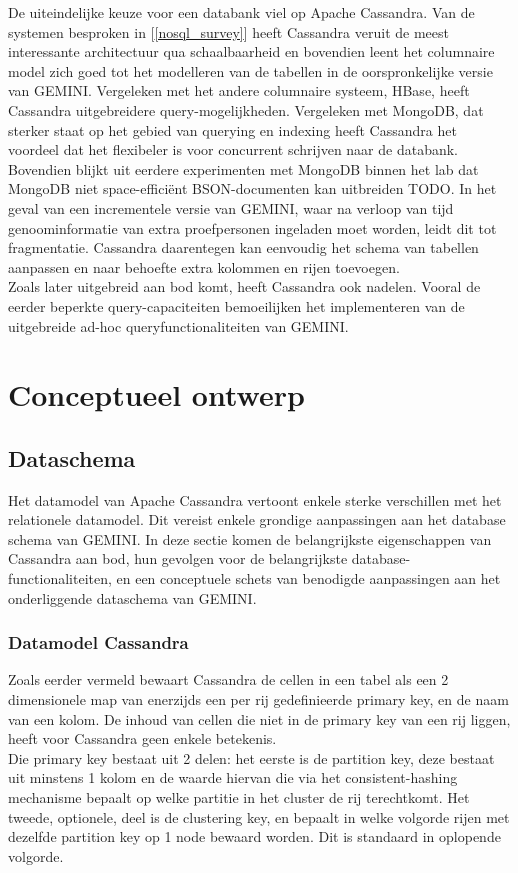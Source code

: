 De uiteindelijke keuze voor een databank viel op Apache Cassandra. Van de systemen besproken in [\ref{nosql_survey}] heeft Cassandra veruit de meest interessante architectuur qua schaalbaarheid en bovendien leent het columnaire model zich goed tot het modelleren van de tabellen in de oorspronkelijke versie van GEMINI. Vergeleken met het andere columnaire systeem, HBase, heeft Cassandra uitgebreidere query-mogelijkheden. Vergeleken met MongoDB, dat sterker staat op het gebied van querying en indexing heeft Cassandra het voordeel dat het flexibeler is voor concurrent schrijven naar de databank. Bovendien blijkt uit eerdere experimenten met MongoDB binnen het lab dat MongoDB niet space-effici\"ent BSON-documenten kan uitbreiden {\color{red} TODO}. %
In het geval van een incrementele versie van GEMINI, waar na verloop van tijd genoominformatie van extra proefpersonen ingeladen moet worden, leidt dit tot fragmentatie. Cassandra daarentegen kan eenvoudig het schema van tabellen aanpassen en naar behoefte extra kolommen en rijen toevoegen.\\
Zoals later uitgebreid aan bod komt, heeft Cassandra ook nadelen. Vooral de eerder beperkte query-capaciteiten bemoeilijken het implementeren van de uitgebreide ad-hoc queryfunctionaliteiten van GEMINI.

\section{Conceptueel ontwerp}

\subsection{Dataschema}

\label{cassandra_datamodel}

Het datamodel van Apache Cassandra vertoont enkele sterke verschillen met het relationele datamodel. Dit vereist enkele grondige aanpassingen aan het database schema van GEMINI. In deze sectie komen de belangrijkste eigenschappen van Cassandra aan bod, hun gevolgen voor de belangrijkste database-functionaliteiten, en een conceptuele schets van benodigde aanpassingen aan het onderliggende dataschema van GEMINI.

\subsubsection{Datamodel Cassandra}

Zoals eerder vermeld bewaart Cassandra de cellen in een tabel als een 2 dimensionele map van enerzijds een per rij gedefinieerde primary key, en de naam van een kolom. De inhoud van cellen die niet in de primary key van een rij liggen, heeft voor Cassandra geen enkele betekenis.\\
Die primary key bestaat uit 2 delen: het eerste is de partition key, deze bestaat uit minstens 1 kolom en de waarde hiervan die via het consistent-hashing mechanisme bepaalt op welke partitie in het cluster de rij terechtkomt. Het tweede, optionele, deel is de clustering key, en bepaalt in welke volgorde rijen met dezelfde partition key op 1 node bewaard worden. Dit is standaard in oplopende volgorde.\\


